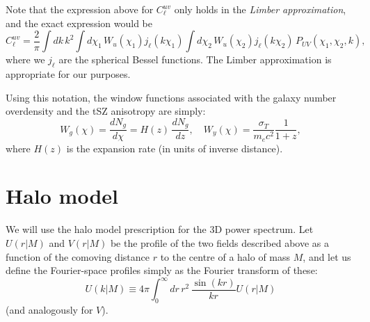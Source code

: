 \documentclass{article}
\begin{document}
Note that the expression above for $C_\ell^{uv}$ only holds in the \emph{Limber approximation}, and the exact expression would be
\begin{equation}
  C^{uv}_\ell=\frac{2}{\pi}\int dk\,k^2 \int d\chi_1\,W_u(\chi_1)j_\ell(k\chi_1)\int d\chi_2\,W_u(\chi_2)j_\ell(k\chi_2)\,P_{UV}(\chi_1,\chi_2,k),
\end{equation}
where we $j_\ell$ are the spherical Bessel functions. The Limber approximation is appropriate for our purposes.

Using this notation, the window functions associated with the galaxy number overdensity and the tSZ anisotropy are simply:
\begin{equation}
  W_g(\chi)=\frac{dN_g}{d\chi}=H(z)\,\frac{dN_g}{dz},\hspace{12pt}W_y(\chi)=\frac{\sigma_T}{m_ec^2}\frac{1}{1+z},
\end{equation}
where $H(z)$ is the expansion rate (in units of inverse distance).


\section{Halo model}
We will use the halo model prescription for the 3D power spectrum. Let $U(r|M)$ and $V(r|M)$ be the profile of the two fields described above as a function of the comoving distance $r$ to the centre of a halo of mass $M$, and let us define the Fourier-space profiles simply as the Fourier transform of these:
\begin{equation}
  U(k|M)\equiv4\pi \int_0^\infty dr\,r^2\,\frac{\sin(kr)}{kr}U(r|M)
\end{equation}
(and analogously for $V$).
\end{document}

